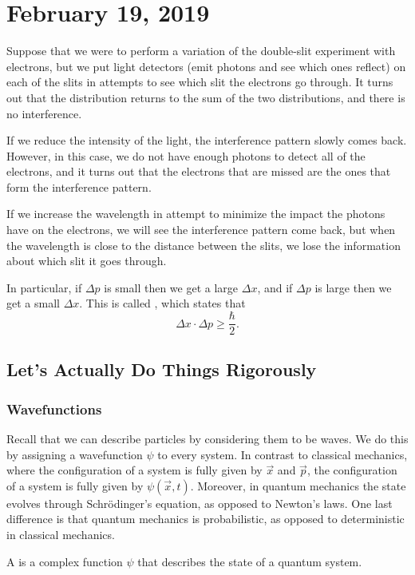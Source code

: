 \documentclass{scrartcl}
\begin{document}
\section{February 19, 2019}
Suppose that we were to perform a variation of the double-slit experiment with electrons, but we put light detectors (emit photons and see which ones reflect) on each of the slits in attempts to see which slit the electrons go through. It turns out that the distribution returns to the sum of the two distributions, and there is no interference.

If we reduce the intensity of the light, the interference pattern slowly comes back. However, in this case, we do not have enough photons to detect all of the electrons, and it turns out that the electrons that are missed are the ones that form the interference pattern.

If we increase the wavelength in attempt to minimize the impact the photons have on the electrons, we will see the interference pattern come back, but when the wavelength is close to the distance between the slits, we lose the information about which slit it goes through.

In particular, if \(\Delta p\) is small then we get a large \(\Delta x\), and if \(\Delta p\) is large then we get a small \(\Delta x\). This is called , which states that
\[
	\Delta x \cdot \Delta p \geq \frac{\hbar}{2}.
\]

\subsection{Let's Actually Do Things Rigorously}\label{subsect:rigorous}
\subsubsection{Wavefunctions}
Recall that we can describe particles by considering them to be waves. We do this by assigning a wavefunction \(\psi\) to every system. In contrast to classical mechanics, where the configuration of a system is fully given by \(\vec x\) and \(\vec p\), the configuration of a system is fully given by \(\psi(\vec x, t)\). Moreover, in quantum mechanics the state evolves through Schr\"odinger's equation, as opposed to Newton's laws. One last difference is that quantum mechanics is probabilistic, as opposed to deterministic in classical mechanics.
\begin{definition}
	A  is a complex function \(\psi\) that describes the state of a quantum system.
\end{definition}
\end{document}
